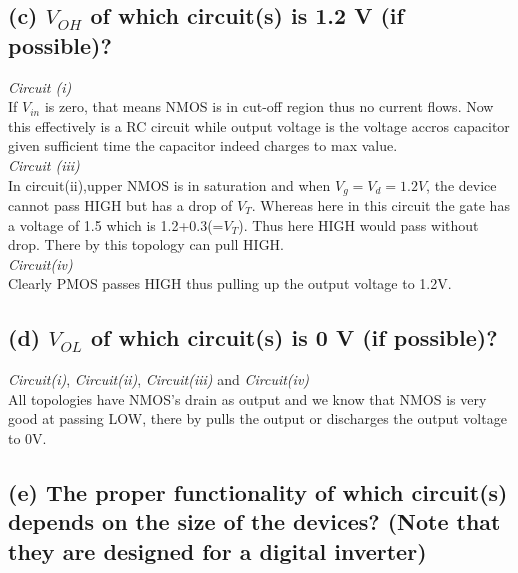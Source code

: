 \documentclass{article}
\begin{document}
\subsection*{(c) $V_{OH}$ of which circuit(s) is 1.2 V (if possible)?}
\textit{Circuit (i)}\\
If $V_{in}$ is zero, that means NMOS is in cut-off region thus no current flows. Now this effectively is a RC circuit while output voltage is the voltage accros capacitor given sufficient time the capacitor indeed charges to max value.\\
 \newline
\textit{Circuit (iii)}\\
In circuit(ii),upper NMOS is in saturation and when $V_{g}=V_{d}=1.2V$, the device cannot pass HIGH but has a drop of $V_{T}$. Whereas here in this circuit the gate has a voltage of 1.5 which is 1.2+0.3(=$V_T$). Thus here HIGH would pass without drop. There by this topology can pull HIGH.\\
 \newline
\textit{Circuit(iv)}\\
Clearly PMOS passes HIGH thus pulling up the output voltage to 1.2V.
\subsection*{(d) $V_{OL}$ of which circuit(s) is 0 V (if possible)?}
\textit{Circuit(i)}, \textit{Circuit(ii)}, \textit{Circuit(iii)} and \textit{Circuit(iv)}\\
All topologies have NMOS's drain as output and we know that NMOS is very good at passing LOW, there by pulls the output or discharges the output voltage to 0V.
\subsection*{(e) The proper functionality of which circuit(s) depends on the size of the devices?
(Note that they are designed for a digital inverter)}
\end{document}
